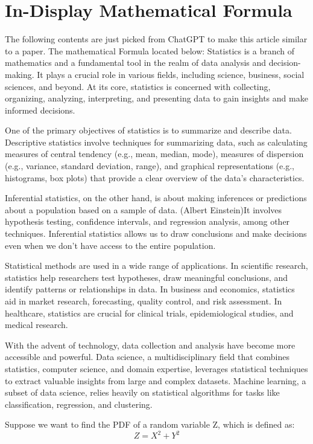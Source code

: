 \documentclass{article}
\begin{document}
\section*{In-Display Mathematical Formula}
The following contents are just picked from ChatGPT to make this article similar to a paper. The mathematical Formula located below: Statistics is a branch of mathematics and a fundamental tool in the realm of data analysis and decision-making. It plays a crucial role in various fields, including science, business, social sciences, and beyond. At its core, statistics is concerned with collecting, organizing, analyzing, interpreting, and presenting data to gain insights and make informed decisions.

One of the primary objectives of statistics is to summarize and describe data. Descriptive statistics involve techniques for summarizing data, such as calculating measures of central tendency (e.g., mean, median, mode), measures of dispersion (e.g., variance, standard deviation, range), and graphical representations (e.g., histograms, box plots) that provide a clear overview of the data's characteristics.

Inferential statistics, on the other hand, is about making inferences or predictions about a population based on a sample of data. (Albert Einstein)It involves hypothesis testing, confidence intervals, and regression analysis, among other techniques. Inferential statistics allows us to draw conclusions and make decisions even when we don't have access to the entire population.

Statistical methods are used in a wide range of applications. In scientific research, statistics help researchers test hypotheses, draw meaningful conclusions, and identify patterns or relationships in data. In business and economics, statistics aid in market research, forecasting, quality control, and risk assessment. In healthcare, statistics are crucial for clinical trials, epidemiological studies, and medical research.\citep{knuth1984}

With the advent of technology, data collection and analysis have become more accessible and powerful. Data science, a multidisciplinary field that combines statistics, computer science, and domain expertise, leverages statistical techniques to extract valuable insights from large and complex datasets. Machine learning, a subset of data science, relies heavily on statistical algorithms for tasks like classification, regression, and clustering.

Suppose we want to find the PDF of a random variable Z, which is defined as:
    \begin{equation}
        Z=X^2+Y^2
    \end{equation}
    
\end{document}
